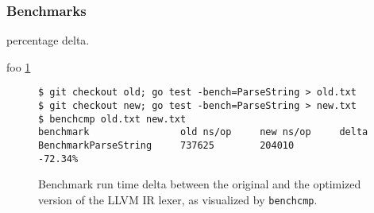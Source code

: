 
\subsubsection{Benchmarks}

percentage delta.

foo \ref{fig:benchmark_delta}

\begin{figure}[htbp]
	\begin{center}
		\begin{verbatim}
$ git checkout old; go test -bench=ParseString > old.txt
$ git checkout new; go test -bench=ParseString > new.txt
$ benchcmp old.txt new.txt
benchmark                old ns/op     new ns/op     delta
BenchmarkParseString     737625        204010        -72.34%
		\end{verbatim}
		\caption{Benchmark run time delta between the original and the optimized version of the LLVM IR lexer, as visualized by \texttt{benchcmp}\protect\footnotemark.}
		\label{fig:benchmark_delta}
	\end{center}
\end{figure}
